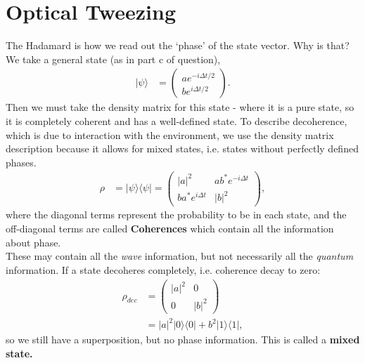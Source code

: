 \documentclass[a4paper, 11pt, normalem]{report}
\begin{document}
\chapter{Optical Tweezing}

\begin{example}
    The Hadamard is how we read out the `phase' of the state vector.
    Why is that?
    We take a general state (as in part c of question),
    \begin{align}
        |\psi\rangle &= \begin{pmatrix} ae^{-i\Delta t/2} \\ be^{i\Delta t/2} \end{pmatrix}.
    \end{align}
    Then we must take the density matrix for this state - where it is a pure state, so it is completely coherent and has a well-defined state.
    To describe decoherence, which is due to interaction with the environment, we use the density matrix description because it allows for mixed states, i.e. states without perfectly defined phases.
    \begin{align}
        \rho &= |\psi\rangle\langle\psi| = \begin{pmatrix} |a|^2 & ab^*e^{-i\Delta t} \\ ba^*e^{i\Delta t} & |b|^2 \end{pmatrix},
    \end{align}
    where the diagonal terms represent the probability to be in each state, and the off-diagonal terms are called \textbf{Coherences} which contain all the information about phase.\\
    These may contain all the \emph{wave} information, but not necessarily all the \emph{quantum} information.
    If a state decoheres completely, i.e. coherence decay to zero:
    \begin{align}
        \rho_{dec} &= \begin{pmatrix} |a|^2 & 0 \\ 0 & |b|^2\end{pmatrix}\\
                   &= |a|^2|0\rangle\langle0| + b^2|1\rangle\langle1|,
    \end{align}
    so we still have a superposition, but no phase information.
    This is called a \textbf{mixed state.}


\end{example}
\end{document}

